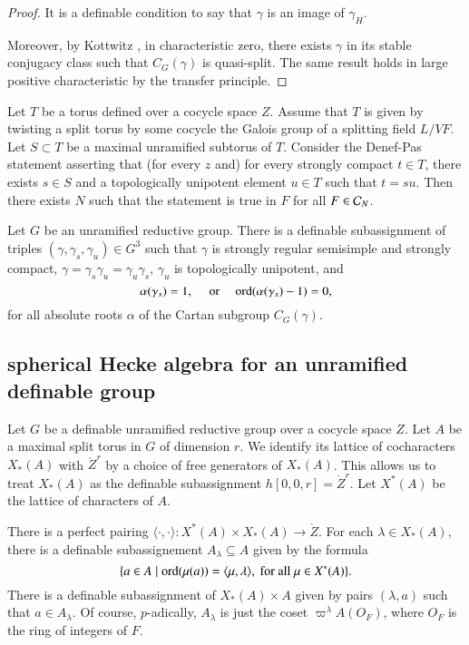 \begin{proof}  It is a definable condition to say that $\gamma$ is an
  image of $\gamma_H$.

  Moreover, by Kottwitz \cite[3.3]{kottwitz1982rational}, in
  characteristic zero, there exists $\gamma$ in its stable conjugacy
  class such that $C_G(\gamma)$ is quasi-split.  The same result holds
  in large positive characteristic by the transfer principle.
\end{proof}


\begin{lemma} 
  Let $T$ be a torus defined over a cocycle space $Z$. Assume that $T$
  is given by twisting a split torus by some cocycle the Galois group
  of a splitting field $L/VF$.  Let $S\subset T$ be a maximal
  unramified subtorus of $T$.  Consider the Denef-Pas statement
  asserting that (for every $z$ and) for every strongly compact $t\in
  T$, there exists $s\in S$ and a topologically unipotent element
  $u\in T$ such that $t =s u$.  Then there exists $N$ such that the
  statement is true in $F$ for all $F\in \mathcal C_N$.
\end{lemma}

\begin{lemma} 
  Let $G$ be an unramified reductive group.  There is a definable
  subassignment of triples $(\gamma,\gamma_s,\gamma_u)\in G^3$ such
  that $\gamma$ is strongly regular semisimple and strongly compact,
  $\gamma = \gamma_s \gamma_u = \gamma_u\gamma_s$, $\gamma_u$ is
  topologically unipotent, and
\[
\alpha(\gamma_s)=1,
\quad\text{ or }
\quad {\operatorname{ord}}(\alpha(\gamma_s)-1)=0,
\]
for all absolute roots $\alpha$ of the Cartan subgroup $C_G(\gamma)$.
\end{lemma}

\subsection{spherical Hecke algebra for an unramified definable group}

Let $G$ be a definable unramified reductive group over a cocycle space
$Z$.  Let $A$ be a maximal split torus in $G$ of dimension $r$.  We
identify its lattice of cocharacters $X_*(A)$ with $\ring{Z}^r$ by a
choice of free generators of $X_*(A)$.  This allows us to treat
$X_*(A)$ as the definable subassignment $h[0,0,r] = \ring{Z}^r$.  Let
$X^*(A)$ be the lattice of characters of $A$.

There is a perfect pairing $\langle\cdot,\cdot\rangle:X^*(A)\times
X_*(A) \to \ring{Z}$.  For each $\lambda\in X_*(A)$, there is a
definable subassignement $A_\lambda \subseteq A$ given by the formula
\[
\{ a \in A \mid {\operatorname{ord}}(\mu(a)) 
= \langle{\mu,\lambda}\rangle,\text{ for all } \mu\in X^*(A) \}.
\]
There is a definable subassignment of $X_*(A)\times A$ given by pairs
$(\lambda,a)$ such that $a\in A_\lambda$.  Of course, $p$-adically,
$A_\lambda$ is just the coset $\varpi^\lambda A(O_F)$, where $O_F$ is
the ring of integers of $F$.

